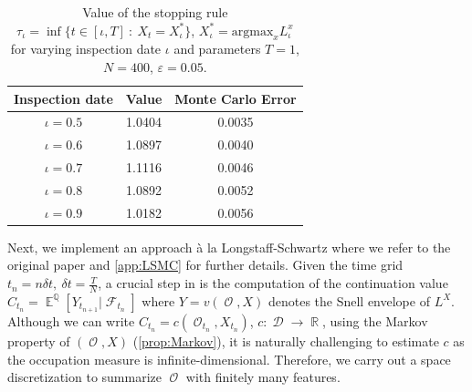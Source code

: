 \documentclass[11pt]{article}
\theoremstyle{plain}
\theoremstyle{definition}
\DeclareMathOperator{\E}{\mathbb{E}}
\DeclareMathOperator{\Q}{\mathbb{Q}}
\DeclareMathOperator{\R}{\mathbb{R}}
\DeclareMathOperator{\calD}{\mathcal{D}}
\DeclareMathOperator{\calF}{\mathcal{F}}
\DeclareMathOperator{\calO}{\mathcal{O}}
\newcommand{\bb}[1]{\textcolor{blue}{#1}}
\begin{document}
\begin{table}[h]
    \centering
        \caption{Value of the stopping rule $\tau_{\iota} = \inf \{ t\in [\iota,T] \ : \ X_t = X^*_\iota\}$, $X^*_\iota = \text{argmax}_{x}L_\iota^x$ for varying inspection date $\iota$ and  parameters  $T=1$,  $N=400$, $\varepsilon =0.05$. }
    \begin{tabular}{ccc}
      Inspection date  &  Value & Monte Carlo Error\\ \hline\hline
       $\iota= 0.5$   & 1.0404 & 0.0035 \\ 
       $\iota= 0.6$   & 1.0897 & 0.0040\\ 
       $\iota= 0.7$   & 1.1116 & 0.0046\\ 
       
         $\iota= 0.8$   &  1.0892 & 0.0052\\ 
  $\iota= 0.9$   & 1.0182 & 0.0056\\    
    \end{tabular}

    \label{tab:earlyPremium2}
\end{table}

 



Next, we implement an approach à la Longstaff-Schwartz  where we refer to the original paper \cite{LS} and \cref{app:LSMC} for further details. Given the time grid $t_n = n\delta t, \ \delta t = \frac{T}{N}$, a  crucial step in \cite{LS} is the computation of the continuation value $C_{t_{n}} = \E^{\Q}[Y_{t_{n+1}} |\calF_{t_n}]$ where $Y = v(\calO,X)$ denotes the  Snell envelope of $L^{X}$. %
 Although we can write $C_{t_{n}} = c(\calO_{t_n},X_{t_n})$, $c:\calD \to \R$, using the Markov property of  $(\calO,X)$ (\cref{prop:Markov}), it is naturally challenging to estimate $c$  as the occupation measure is infinite-dimensional. Therefore, we carry out a space discretization to summarize $\calO$ with finitely many features. %
\end{document}
